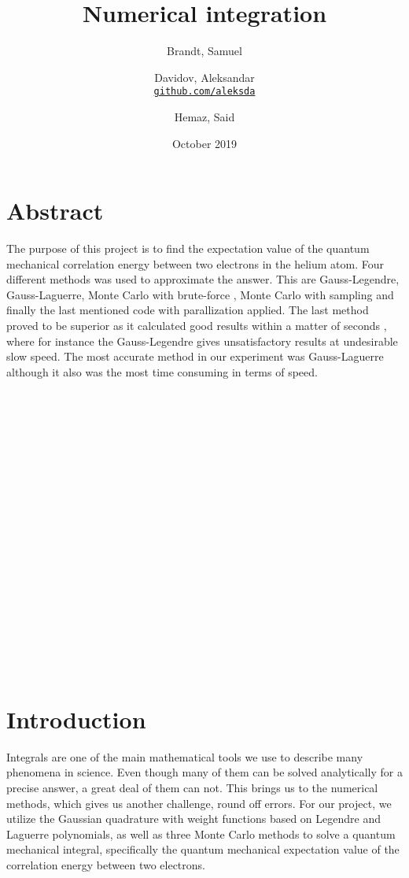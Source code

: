 \documentclass{article}
\title{Numerical integration}
\author{
  Brandt, Samuel\\
  \and
  Davidov, Aleksandar\\
  \textcolor{blue}{\href{https://github.com/aleksda/FYS4150/}{\texttt{github.com/aleksda}}}
  \and
  Hemaz, Said\\
}
\date{October 2019}
\begin{document}
\maketitle




\section{Abstract}
The purpose of this project is to find the expectation value of the quantum mechanical correlation energy between two electrons in the helium atom. Four different methods was used to approximate the answer. This are Gauss-Legendre, Gauss-Laguerre, Monte Carlo with brute-force , Monte Carlo with sampling and finally the last mentioned code with parallization applied. The last method proved to be superior as it calculated good results within a matter of seconds , where for instance the Gauss-Legendre gives unsatisfactory results at undesirable slow speed. The most accurate method in our experiment was Gauss-Laguerre although it also was the most time consuming in terms of speed.\\\\\\\\\\\\\\\\\\\\\\\\\\\\\\\\\\\\\\\\

\tableofcontents

\newpage

\iffalse
\begin{figure}[h!]
\centering
\texttt{[image: universe]}
\caption{The Universe}
\label{fig:universe}
\end{figure}
\fi
\newpage
\section{Introduction}

Integrals are one of the main mathematical tools we use to describe many phenomena in science. Even though many of them can be solved analytically for a precise answer, a great deal of them can not. This brings us to the numerical methods, which gives us another challenge, round off errors. For our project, we utilize the Gaussian quadrature with weight functions based on Legendre and Laguerre polynomials, as well as three Monte Carlo methods to solve a quantum mechanical integral, specifically the quantum mechanical expectation value of the correlation energy between two electrons.
\end{document}
